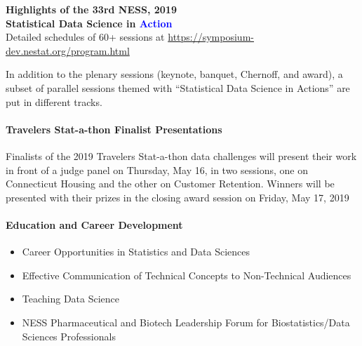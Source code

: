 \documentclass[12pt]{article}
\newcommand{\blue}[1]{{\textcolor{blue}{#1}}}
\begin{document}
\newpage

\begin{center}
  {\bf\LARGE Highlights of the 33rd NESS, 2019\\[1ex]
    Statistical Data Science in \blue{\Huge Action}}\\[1ex]
  Detailed schedules of 60+ sessions at \url{https://symposium-dev.nestat.org/program.html}
\end{center}

In addition to the plenary sessions (keynote, banquet, Chernoff, and
award), a subset of parallel sessions themed with ``Statistical Data
Science in Actions'' are put in different tracks.

\paragraph{Travelers Stat-a-thon Finalist Presentations}
Finalists of the 2019 Travelers Stat-a-thon data challenges will
present their work in front of a judge panel on Thursday, May 16, in
two sessions, one on Connecticut Housing and the other on Customer
Retention. Winners will be presented with their prizes in the closing
award session on Friday, May 17, 2019

\paragraph{Education and Career Development}
\begin{itemize}
\item
  Career Opportunities in Statistics and Data
  Sciences
\item
  Effective Communication of Technical
  Concepts to Non-Technical Audiences
\item
  Teaching Data Science
\item
  NESS Pharmaceutical and Biotech Leadership
  Forum for Biostatistics/Data Sciences Professionals
\end{itemize}
\end{document}
